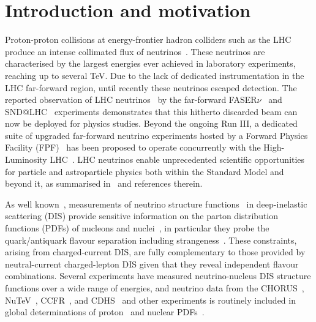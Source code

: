 \section{Introduction and motivation}
\label{sec:introduction}

Proton-proton collisions at energy-frontier hadron colliders
such as the LHC produce an intense collimated flux of neutrinos~\cite{Kling:2021gos}.
%
These neutrinos are characterised by the largest energies ever achieved in laboratory experiments,
reaching up to several TeV.
%
Due to the lack of dedicated instrumentation in the LHC far-forward region,
until recently these neutrinos escaped detection.
%
The reported observation of LHC neutrinos~\cite{FASER:2023zcr,SNDLHC:2023pun} by the
far-forward  FASER$\nu$~\cite{FASER:2019dxq} and SND@LHC~\cite{SHiP:2020sos,SNDLHC:2022ihg} experiments
demonstrates that this hitherto discarded beam can now be deployed for physics studies.
%
Beyond the ongoing Run III, a dedicated suite of upgraded far-forward
neutrino experiments hosted by a
Forward Physics Facility (FPF)~\cite{Anchordoqui:2021ghd,Feng:2022inv} has been
proposed to operate concurrently with the High-Luminosity LHC~\cite{Azzi:2019yne,Cepeda:2019klc}.
%
LHC neutrinos enable
unprecedented scientific opportunities
for particle and astroparticle physics both within the Standard Model and beyond it,
as summarised in~\cite{Anchordoqui:2021ghd,Feng:2022inv}
and references therein.

As well known~\cite{Conrad:1997ne,Mangano:2001mj},
measurements of neutrino structure functions~\cite{Candido:2023utz} in deep-inelastic scattering
(DIS) provide sensitive information on the parton distribution functions (PDFs)
of nucleons and nuclei~\cite{Ethier:2020way,Gao:2017yyd,Kovarik:2019xvh}, in particular
they probe the quark/antiquark  flavour separation including
strangeness~\cite{NuTeV:2007uwm,CCFR:1994ikl,Faura:2020oom,NOMAD:2013hbk}.
%
These constraints, arising from charged-current DIS, are fully complementary to those
provided by neutral-current charged-lepton DIS given that they reveal independent
flavour combinations.
%
Several  experiments have measured neutrino-nucleus
DIS structure functions over a wide range of energies, and neutrino data
from the CHORUS~\cite{CHORUS:2005cpn}, NuTeV~\cite{NuTeV:2001dfo},
CCFR~\cite{Yang:2000ju}, and CDHS~\cite{Berge:1989hr}
and other experiments is routinely  included in global
determinations of proton~\cite{NNPDF:2021njg,Hou:2019efy,Bailey:2020ooq} and nuclear
PDFs~\cite{Eskola:2021nhw,AbdulKhalek:2022fyi,Muzakka:2022wey}.

